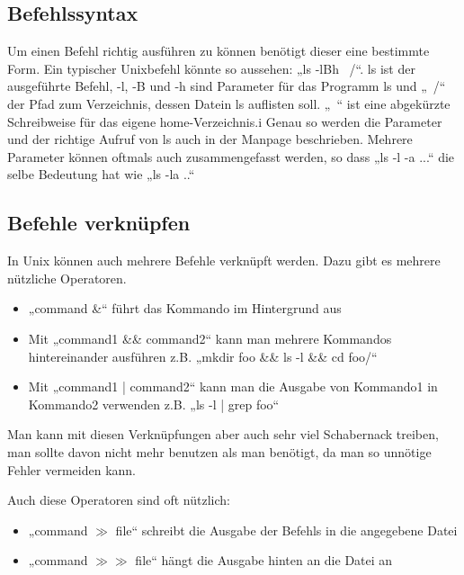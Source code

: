 \subsection{Befehlssyntax}
Um einen Befehl richtig ausführen zu können benötigt dieser eine bestimmte Form. Ein typischer Unixbefehl könnte so aussehen:
„ls -lBh ~/“. ls ist der ausgeführte Befehl, -l, -B und -h sind Parameter für das Programm ls und „~/“ der Pfad zum Verzeichnis, dessen Datein ls auflisten soll. „~“ ist eine abgekürzte Schreibweise für das eigene home-Verzeichnis.i
Genau so werden die Parameter und der richtige Aufruf von ls auch in der Manpage beschrieben. Mehrere Parameter können oftmals auch zusammengefasst werden, so dass „ls -l -a ...“ die selbe Bedeutung hat wie „ls -la ..“

\subsection{Befehle verknüpfen}
In Unix können auch mehrere Befehle verknüpft werden. Dazu gibt es mehrere nützliche Operatoren.
\begin{itemize}
\item „command \&“ führt das Kommando im Hintergrund aus
\item Mit „command1 \&\& command2“ kann man mehrere Kommandos hintereinander ausführen z.B. „mkdir foo \&\& ls -l \&\& cd foo/“
\item Mit „command1 | command2“ kann man die Ausgabe von Kommando1 in Kommando2 verwenden  z.B. „ls -l | grep foo“
\end{itemize}

Man kann mit diesen Verknüpfungen aber auch sehr viel Schabernack treiben, man sollte davon nicht mehr benutzen als man benötigt, da man so unnötige Fehler vermeiden kann.

Auch diese Operatoren sind oft nützlich:
\begin{itemize}
\item „command $\gg$ file“ schreibt die Ausgabe der Befehls in die angegebene Datei
\item „command $\gg\gg$ file“ hängt die Ausgabe hinten an die Datei an
\end{itemize}

